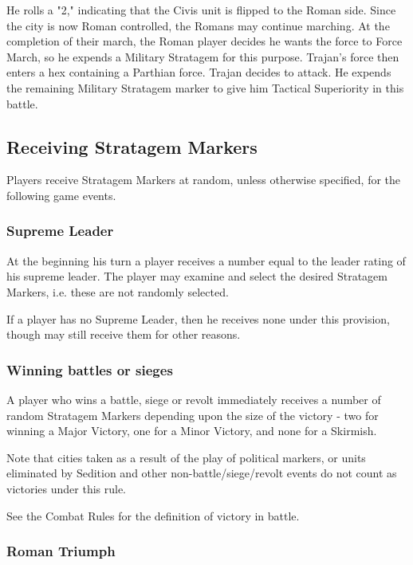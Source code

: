 He rolls a "2," indicating that the Civis unit is flipped to the Roman side. Since the city is now Roman controlled, the Romans may continue marching. At the completion of their march, the Roman player decides he wants the force to Force March, so he expends a Military Stratagem for this purpose. Trajan's force then enters a hex containing a Parthian force. Trajan decides to attack. He expends the remaining Military Stratagem marker to give him Tactical Superiority in this battle.

\subsection{Receiving Stratagem Markers}

Players receive Stratagem Markers at random, unless otherwise specified, for the following game events.

\subsubsection{Supreme Leader}

At the beginning his turn a player receives a number equal to the leader rating of his supreme leader. The player may examine and select the desired Stratagem Markers, i.e. these are not randomly selected.

If a player has no Supreme Leader, then he receives none under this provision, though may still receive them for other reasons.

\subsubsection{Winning battles or sieges}

A player who wins a battle, siege or revolt immediately receives a number of random Stratagem Markers depending upon the size of the victory - two for winning a Major Victory, one for a Minor Victory, and none for a Skirmish.

Note that cities taken as a result of the play of political markers, or units eliminated by Sedition and other non-battle/siege/revolt events do not count as victories under this rule.

See the Combat Rules for the definition of victory in battle.

\subsubsection{Roman Triumph}

